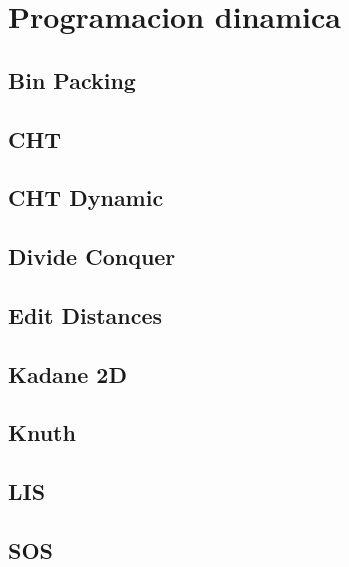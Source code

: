 \section{Programacion dinamica}
\subsection{Bin Packing}
\raggedbottom
\hrulefill
\subsection{CHT}
\raggedbottom
\hrulefill
\subsection{CHT Dynamic}
\raggedbottom
\hrulefill
\subsection{Divide Conquer}
\raggedbottom
\hrulefill
\subsection{Edit Distances}
\raggedbottom
\hrulefill
\subsection{Kadane 2D}
\raggedbottom
\hrulefill
\subsection{Knuth}
\raggedbottom
\hrulefill
\subsection{LIS}
\raggedbottom
\hrulefill
\subsection{SOS}
\raggedbottom
\hrulefill

